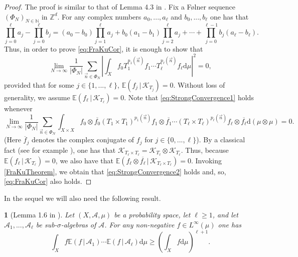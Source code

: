 \documentclass[11pt,american,preprint]{elsarticle}
\numberwithin{equation}{section}
\theoremstyle{plain}
\theoremstyle{plain*}
\theoremstyle{plain}
\newtheorem{lem}[thm]{\protect\lemmaname}
\theoremstyle{plain*}
\theoremstyle{plain}
\theoremstyle{plain*}
\theoremstyle{remark}
\theoremstyle{remark*}
\theoremstyle{remark}
\theoremstyle{remark*}
\theoremstyle{remark}
\theoremstyle{remark*}
\theoremstyle{plain}
\theoremstyle{definition}
\theoremstyle{plain}
\theoremstyle{plain} %
\providecommand{\lemmaname}{Lemma}
\newcommand{\N}{\mathbb{N}}
\newcommand{\Z}{\mathbb{Z}}
\begin{document}
\begin{proof}
The  proof is similar to that of  Lemma 4.3 in \cite{FraKra2006IndependentPolys}.
    Fix a F{\o}lner sequence $(\Phi_N)_{N\in\N}$ in $\Z^d$. For any complex numbers $a_0,...,a_\ell$ and $b_0,...,b_\ell$ one has that
\begin{equation}\label{eq:IntegralZeroIdentity}
        \prod_{j=0}^\ell a_j-\prod_{j=0}^\ell b_j
    =(a_0-b_0)\prod_{j=1}^\ell a_j+b_0(a_1-b_1)\prod_{j=2}^\ell a_j+
    \cdots+\prod_{j=0}^{\ell-1}b_j(a_\ell-b_\ell).
    \end{equation}
    Thus, in order to prove \eqref{eq:FraKuCor}, it is enough to show that 
\begin{equation}\label{eq:StrongConvergence1}
    \lim_{N\rightarrow\infty}\frac{1}{|\Phi_N|}\sum_{\vec n\in\Phi_N}|\int_Xf_0T_1^{p_1(\vec n)}f_1\cdots T_\ell^{p_\ell(\vec n)}f_\ell\text{d}\mu|^2=0,
    \end{equation}
    provided that for some $j\in\{1,...,\ell\}$, $\mathbb E(f_j\,|\,\mathcal K_{T_j})=0$. Without loss of generality, we assume $\mathbb E(f_\ell\,|\,\mathcal K_{T_\ell})=0$. Note that \eqref{eq:StrongConvergence1} holds whenever
    \begin{equation}\label{eq:StrongConvergence2}
    \lim_{N\rightarrow\infty}\frac{1}{|\Phi_N|}\sum_{\vec n\in\Phi_N}\int_{X\times X}f_0\otimes \overline {f_0}(T_1\times T_1)^{p_1(\vec n)}f_1\otimes \overline {f_1}\cdots(T_\ell\times T_\ell)^{p_\ell(\vec n)}f_\ell\otimes \overline {f_\ell}\text{d}(\mu\otimes\mu)=0.
    \end{equation}
    (Here $\overline f_j$ denotes the complex conjugate of $f_j$ for $j\in \{0,...,\ell\}$). By a classical fact (see for example  \cite[Lemma 4.18]{Fbook}), one has that $\mathcal K_{T_\ell\times T_\ell}=\mathcal K_{T_\ell}\otimes \mathcal K_{T_\ell}$. Thus, because $\mathbb E(f_\ell\,|\,\mathcal K_{T_\ell})=0$, we also have that $\mathbb E(f_\ell \otimes \overline{f_\ell}\,|\,\mathcal K_{T_\ell\times T_\ell})=0$. Invoking \cref{FraKuTheorem}, we obtain that \eqref{eq:StrongConvergence2} holds and, so, \eqref{eq:FraKuCor} also holds. 
\end{proof}
In the sequel we will also need the following result.
\begin{lem}[Lemma 1.6 in \cite{ChuLowerBoundForCommutingTs}]\label{2.lem:ProdExpectationsLowerBound}
    Let $(X,\mathcal A,\mu)$ be a probability space, let $\ell\geq 1$, and let $\mathcal A_1,...,\mathcal A_\ell$ be sub-$\sigma$-algebras of $\mathcal A$. For any non-negative $f\in L^\infty(\mu)$ one has
    $$\int_X f\mathbb E(f\,|\,\mathcal A_1)\cdots\mathbb E(f\,|\,\mathcal A_\ell)\text{d}\mu\geq \left( \int_X f\text{d}\mu\right)^{\ell+1}.$$
\end{lem}
\end{document}
